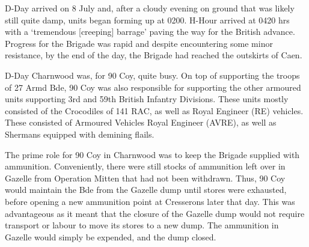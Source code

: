 \documentclass[noraggedright]{turabian-researchpaper}
\newcommand{\CharnAdm}{27 Armd Bde Adm Order No. 7, 7 July 1944}
\begin{document}



D-Day arrived on 8 July and, after a cloudy evening on ground that was likely 
still quite damp, units began forming up at 0200.  H-Hour arrived at 0420 hrs 
with a `tremendous [creeping] barrage' paving the way for the British 
advance.\autocite[8 July 1944]{27wd}  Progress for the Brigade was rapid and 
despite encountering some minor resistance, by the end of the day, the 
Brigade had reached the outskirts of Caen.\autocite[8 July 1944]{27wd}

D-Day Charnwood was, for 90 Coy, quite busy.  On top of supporting the troops 
of 27 Armd Bde, 90 Coy was also responsible for supporting the other armoured 
units supporting 3rd and 59th British Infantry Divisions.\autocite[\CharnAdm]
[Para. 3]{27wd}  These units mostly consisted of the Crocodiles of 141 RAC, 
as well as Royal Engineer (RE) vehicles.  These consisted of Armoured 
Vehicles Royal Engineer (AVRE), as well as Shermans equipped with demining 
flails.  %


The prime role for 90 Coy in Charnwood was to keep the Brigade supplied with 
ammunition.  Conveniently, there were still stocks of ammunition left over in 
Gazelle from Operation Mitten that had not been withdrawn.  Thus, 90 Coy 
would maintain the Bde from the Gazelle dump until stores were exhausted, %
before opening a new ammunition point at Cresserons later that day.\autocites
[\CharnAdm]{27wd}[8 July 1944]{90wd} This was advantageous as it meant that 
the closure of the Gazelle dump would not require transport or labour to move 
its stores to a new dump.  The ammunition in Gazelle would simply be 
expended, and the dump closed.  %
\end{document}
